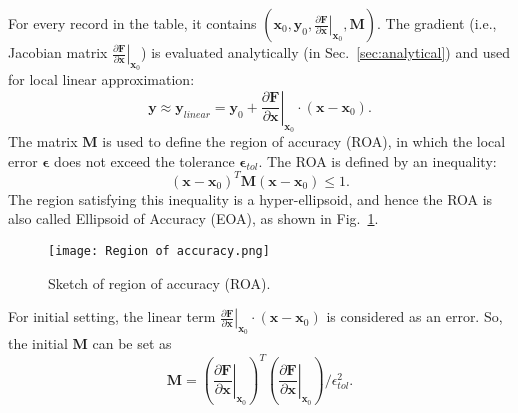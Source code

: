 
For every record in the table, it contains $(\mathbf{x}_0,\mathbf{y}_0,\left.\frac{\partial  \mathbf{F}}{\partial \mathbf{x}}\right|_{\mathbf{x}_0}, \mathbf{M})$. 
The gradient (i.e., Jacobian matrix $\left.\frac{\partial  \mathbf{F}}{\partial \mathbf{x}}\right|_{\mathbf{x}_0}$) is evaluated analytically (in Sec.~\ref{sec:analytical}) and used for local linear approximation:
$$\mathbf{y}\approx\mathbf{y}_{linear}=\mathbf{y}_0+\left.\frac{\partial  \mathbf{F}}{\partial \mathbf{x}}\right|_{\mathbf{x}_0}\cdot\left(\mathbf{x}-\mathbf{x}_0\right).$$
The matrix $\mathbf{M}$ is used to define the region of accuracy (ROA), in which the local error
$\mathbf{\epsilon}$ does not exceed the tolerance $\mathbf{\epsilon}_{tol}$. The ROA is defined by an inequality:
$$\left(\mathbf{x}-\mathbf{x}_0\right)^T \mathbf{M} \left(\mathbf{x}-\mathbf{x}_0\right) \leq 1.$$
The region satisfying this inequality is a hyper-ellipsoid, and hence the ROA is also called Ellipsoid of Accuracy (EOA), as shown in Fig.~\ref{ISAT_ROA}.
\begin{figure}[htbp]
    \centering
\texttt{[image: Region of accuracy.png]} 
\caption{Sketch of region of accuracy (ROA).}
\label{ISAT_ROA} 
\end{figure}
For initial setting, the linear term $\left.\frac{\partial  \mathbf{F}}{\partial \mathbf{x}}\right|_{\mathbf{x}_0}\cdot\left(\mathbf{x}-\mathbf{x}_0\right)$ is considered as an error. So, the initial $\mathbf{M}$ can be set as 
$$\mathbf{M}=\left(\left.\frac{\partial  \mathbf{F}}{\partial \mathbf{x}}\right|_{\mathbf{x}_0}\right)^T \left(\left.\frac{\partial  \mathbf{F}}{\partial \mathbf{x}}\right|_{\mathbf{x}_0}\right)/\epsilon_{tol}^2.$$



